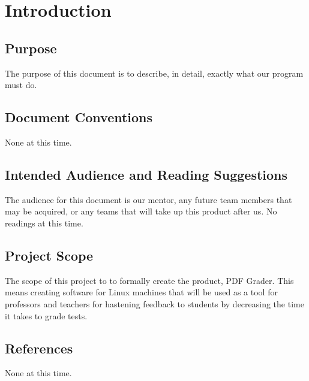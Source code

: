 \section{Introduction}


\subsection{Purpose}
The purpose of this document is to describe, in detail, exactly what our program must do. 

\subsection{Document Conventions}
None at this time.

\subsection{Intended Audience and Reading Suggestions}
The audience for this document is our mentor, any future team members that may be acquired, or any teams that will take up this product after us. No readings at this time.

\subsection{Project Scope}
The scope of this project to to formally create the product, PDF Grader. This means creating software for Linux machines that will be used as a tool for professors and teachers for hastening feedback to students by decreasing the time it takes to grade tests.

\subsection{References}
None at this time.


